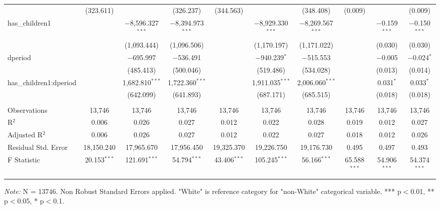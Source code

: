 \documentclass[a4paper]{article}
\begin{document}
\begin{landscape}
\begin{table}[!htbp]
\begin{adjustwidth}{1.25cm}{-0cm}
\begin{threeparttable}
\begin{tabular}{@{\extracolsep{-2pt}}lccccccccc}
  & (323.611) &  & (326.237) & (344.563) &  & (348.408) & (0.009) &  & (0.009) \\ 
  has\_children1 &  & $-$8,596.327$^{***}$ & $-$8,394.973$^{***}$ &  & $-$8,929.330$^{***}$ & $-$8,269.567$^{***}$ &  & $-$0.159$^{***}$ & $-$0.150$^{***}$ \\ 
  &  & (1,093.444) & (1,096.506) &  & (1,170.197) & (1,171.022) &  & (0.030) & (0.030) \\ 
  dperiod &  & $-$695.997 & $-$536.491 &  & $-$940.239$^{*}$ & $-$515.553 &  & $-$0.005 & $-$0.024$^{*}$ \\ 
  &  & (485.413) & (500.046) &  & (519.486) & (534.028) &  & (0.013) & (0.014) \\ 
  has\_children1:dperiod &  & 1,682.810$^{***}$ & 1,722.360$^{***}$ &  & 1,911.035$^{***}$ & 2,006.060$^{***}$ &  & 0.031$^{*}$ & 0.033$^{*}$ \\ 
  &  & (642.099) & (641.893) &  & (687.171) & (685.515) &  & (0.018) & (0.018) \\ 
 \hline \\[-1.8ex] 
Observations & 13,746 & 13,746 & 13,746 & 13,746 & 13,746 & 13,746 & 13,746 & 13,746 & 13,746 \\ 
R$^{2}$ & 0.006 & 0.026 & 0.027 & 0.012 & 0.022 & 0.028 & 0.019 & 0.012 & 0.027 \\ 
Adjusted R$^{2}$ & 0.006 & 0.026 & 0.027 & 0.012 & 0.022 & 0.027 & 0.018 & 0.012 & 0.026 \\ 
Residual Std. Error & 18,150.240  & 17,965.670 & 17,956.450  & 19,325.370 & 19,226.750  & 19,176.730 & 0.495  & 0.497  & 0.493 \\ 
F Statistic & 20.153$^{***}$  & 121.691$^{***}$  & 54.794$^{***}$  & 43.406$^{***}$  & 105.245$^{***}$ & 56.166$^{***}$ & 65.588$^{***}$& 54.906$^{***}$ & 54.374$^{***}$ \\ 
\hline 
\hline \\[-3.5ex] 
\end{tabular} 
\begin{tablenotes}
      \small
      \item\textit{Note:} N = 13746. Non Robust Standard Errors applied. "White" is reference category for "non-White" categorical variable. *** p$<$0.01, ** p$<$0.05, * p$<$0.1.
    \end{tablenotes}
\end{threeparttable}
\end{adjustwidth}
%
\end{table}

\end{landscape}
\end{document}
